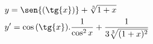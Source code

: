 \begin{ex}
\begin{align}
&y=\sen{(\tg{x})}+\sqrt[3]{1+x}\nonumber\\
&y'=\cos{(\tg{x})}.\frac{1}{\cos^2{x}}+\frac{1}{3\sqrt[3]{(1+x)^2}}\nonumber
\end{align}
\end{ex}